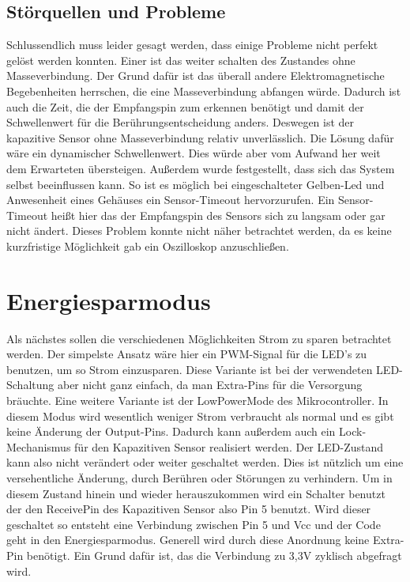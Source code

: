 \documentclass[a4paper,
DIV=13,
12pt,
BCOR=10mm,
department=FakEI,
parskip=half,
automark,
]{article}
\begin{document}
\subsection{Störquellen und Probleme}
Schlussendlich muss leider gesagt werden, dass einige Probleme nicht perfekt gelöst werden konnten. Einer ist das weiter schalten des Zustandes ohne Masseverbindung. Der Grund dafür ist das überall andere Elektromagnetische Begebenheiten herrschen, die eine Masseverbindung abfangen würde. Dadurch ist auch die Zeit, die der Empfangspin zum erkennen benötigt und damit der Schwellenwert für die Berührungsentscheidung anders. Deswegen ist der kapazitive Sensor ohne Masseverbindung relativ unverlässlich. Die Lösung dafür wäre ein dynamischer Schwellenwert. Dies würde aber vom Aufwand her weit dem Erwarteten übersteigen. Außerdem wurde festgestellt, dass sich das System selbst beeinflussen kann. So ist es möglich bei eingeschalteter Gelben-Led und Anwesenheit eines Gehäuses ein Sensor-Timeout hervorzurufen. Ein Sensor-Timeout heißt hier das der Empfangspin des Sensors sich zu langsam oder gar nicht ändert. Dieses Problem konnte nicht näher betrachtet werden, da es keine kurzfristige Möglichkeit gab ein Oszilloskop anzuschließen.



\newpage
\section{Energiesparmodus}
\label{Energie}
Als nächstes sollen die verschiedenen Möglichkeiten Strom zu sparen betrachtet werden. Der simpelste Ansatz wäre hier ein PWM-Signal für die LED's zu benutzen, um so Strom einzusparen. Diese Variante ist bei der verwendeten LED-Schaltung aber nicht ganz einfach, da man Extra-Pins für die Versorgung bräuchte. Eine weitere Variante ist der LowPowerMode des Mikrocontroller. In diesem Modus wird wesentlich weniger Strom verbraucht als normal und es gibt keine Änderung der Output-Pins. Dadurch kann außerdem auch ein Lock-Mechanismus für den Kapazitiven Sensor realisiert werden. Der LED-Zustand kann also nicht verändert oder weiter geschaltet werden. Dies ist nützlich um eine versehentliche Änderung, durch Berühren oder Störungen zu verhindern. Um in diesem Zustand hinein und wieder herauszukommen wird ein Schalter benutzt der den ReceivePin des Kapazitiven Sensor also Pin 5 benutzt. Wird dieser geschaltet so entsteht eine Verbindung zwischen Pin 5 und Vcc und der Code geht in den Energiesparmodus. Generell wird durch diese Anordnung keine Extra-Pin benötigt. Ein Grund dafür ist, das die Verbindung zu 3,3V zyklisch abgefragt wird.
\end{document}

